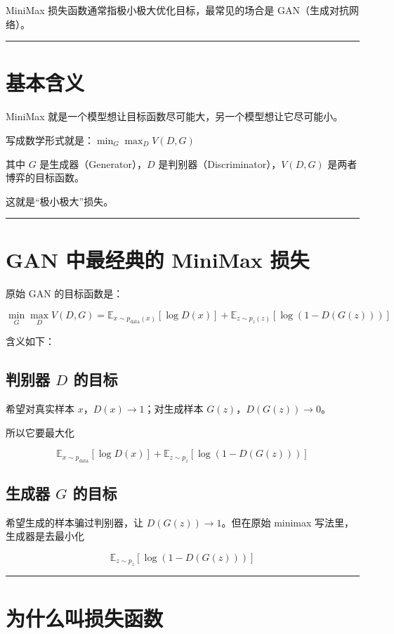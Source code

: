 MiniMax 损失函数通常指极小极大优化目标，最常见的场合是 GAN（生成对抗网络）。

\hrule

\section{基本含义}

MiniMax 就是一个模型想让目标函数尽可能大，另一个模型想让它尽可能小。

写成数学形式就是：\(\min_G \max_D V(D,G)\)

其中 \(G\) 是生成器（Generator），\(D\) 是判别器（Discriminator），\(V(D,G)\) 是两者博弈的目标函数。

这就是“极小极大”损失。

\hrule

\section{GAN 中最经典的 MiniMax 损失}

原始 GAN 的目标函数是：

\[
\min_G \max_D V(D,G) = \mathbb E_{x\sim p_{\text{data}}(x)}[\log D(x)] + \mathbb E_{z\sim p_z(z)}[\log(1-D(G(z)))]
\]

含义如下：

\subsection{判别器 \(D\) 的目标}

希望对真实样本 \(x\)，\(D(x)\to 1\)；对生成样本 \(G(z)\)，\(D(G(z))\to 0\)。

所以它要最大化

\[
\mathbb E_{x\sim p_{\text{data}}}[\log D(x)] + \mathbb E_{z\sim p_z}[\log(1-D(G(z)))]
\]

\subsection{生成器 \(G\) 的目标}

希望生成的样本骗过判别器，让 \(D(G(z))\to 1\)。但在原始 minimax 写法里，生成器是去最小化

\[
\mathbb E_{z\sim p_z}[\log(1-D(G(z)))]
\]

\hrule

\section{为什么叫损失函数}

